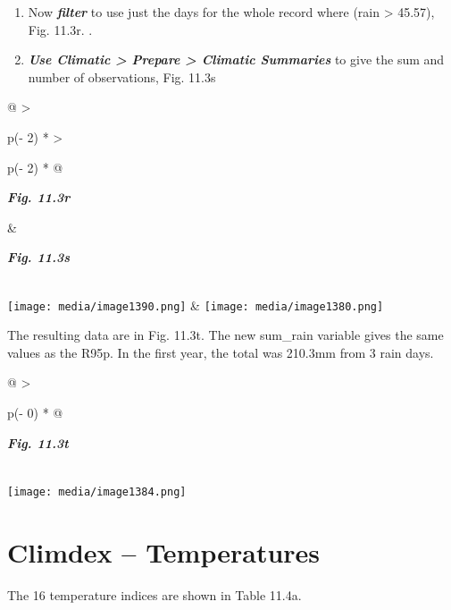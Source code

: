 \documentclass[
  letterpaper,
  DIV=11,
  numbers=noendperiod]{scrreprt}
\begin{document}
\begin{enumerate}
\def\labelenumi{\arabic{enumi}.}
\setcounter{enumi}{2}
\item
  Now \textbf{\emph{filter}} to use just the days for the whole record
  where (rain \textgreater{} 45.57), Fig. 11.3r. .
\item
  \textbf{\emph{Use Climatic \textgreater{} Prepare \textgreater{}
  Climatic Summaries}} to give the sum and number of observations, Fig.
  11.3s
\end{enumerate}

\begin{longtable}[]{@{}
  >{\raggedright\arraybackslash}p{(\columnwidth - 2\tabcolsep) * }
  >{\raggedright\arraybackslash}p{(\columnwidth - 2\tabcolsep) * }@{}}
\toprule\noalign{}
\begin{minipage}[b]{\linewidth}\raggedright
\textbf{\emph{Fig. 11.3r}}
\end{minipage} & \begin{minipage}[b]{\linewidth}\raggedright
\textbf{\emph{Fig. 11.3s}}
\end{minipage} \\
\midrule\noalign{}
\endhead
\bottomrule\noalign{}
\endlastfoot
\texttt{[image: media/image1390.png]}
&
\texttt{[image: media/image1380.png]} \\
\end{longtable}

The resulting data are in Fig. 11.3t. The new sum\_rain variable gives
the same values as the R95p. In the first year, the total was 210.3mm
from 3 rain days.

\begin{longtable}[]{@{}
  >{\raggedright\arraybackslash}p{(\columnwidth - 0\tabcolsep) * }@{}}
\toprule\noalign{}
\begin{minipage}[b]{\linewidth}\raggedright
\textbf{\emph{Fig. 11.3t}}
\end{minipage} \\
\midrule\noalign{}
\endhead
\bottomrule\noalign{}
\endlastfoot
\texttt{[image: media/image1384.png]} \\
\end{longtable}

\section{Climdex -- Temperatures}\label{climdex-temperatures}

The 16 temperature indices are shown in Table 11.4a.
\end{document}
